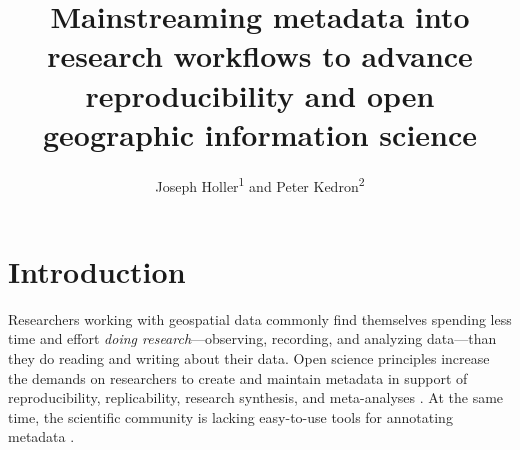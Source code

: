 \documentclass{isprs} %
\begin{document}
\title{Mainstreaming metadata into research workflows to advance reproducibility and open geographic information science}
\date{}


\author{Joseph Holler\textsuperscript{1} and Peter Kedron\textsuperscript{2}}

\address{\textsuperscript{1}Department of Geography, Middlebury College - josephh@middlebury.edu \\
\textsuperscript{2}School of Geographical Sciences and Urban Planning, Arizona State University - peter.kedron@asu.edu}




\commission{}{} %
\workinggroup{} %
\icwg{}   %



\maketitle


\sloppy

\section{Introduction}\label{Introduction}

Researchers working with geospatial data commonly find themselves spending less time and effort \textit{doing research}---observing, recording, and analyzing data---than they do reading and writing about their data.
Open science principles increase the demands on researchers to create and maintain metadata in support of reproducibility, replicability, research synthesis, and meta-analyses \citep{NASEM2019}.
At the same time, the scientific community is lacking easy-to-use tools for annotating metadata \citep{NASEM2018}.
\end{document}
